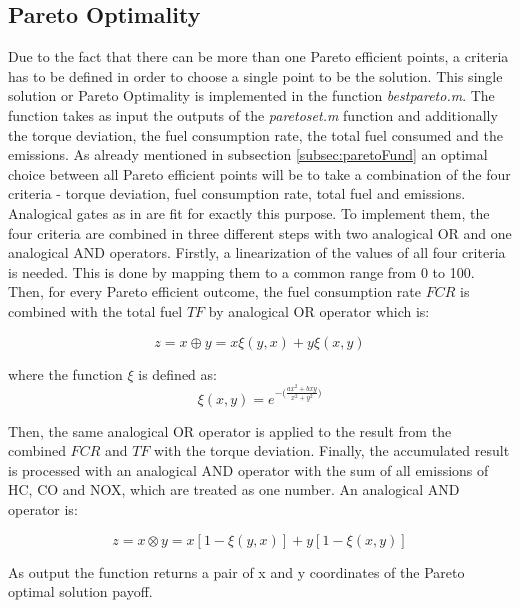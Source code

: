 \subsection{Pareto Optimality}
\label{subsec:paretoImpl}
Due to the fact that there can be more than one Pareto efficient points, a criteria has to be defined in order to choose a single point to be the solution. This single solution or Pareto Optimality is implemented in the function \textit{bestpareto.m}. The function takes as input the outputs of the \textit{paretoset.m} function and additionally the torque deviation, the fuel consumption rate, the total fuel consumed and the emissions. As already mentioned in subsection \ref{subsec:paretoFund} an optimal choice between all Pareto efficient points will be to take a combination of the four criteria - torque deviation, fuel consumption rate, total fuel and emissions. Analogical gates as in \citet{badreddin1995analogical} are fit for exactly this purpose. To implement them, the four criteria are combined in three different steps with two analogical OR and one analogical AND operators. Firstly, a linearization of the values of all four criteria is needed. This is done by mapping them to a common range from 0 to 100. Then, for every Pareto efficient outcome, the fuel consumption rate $FCR$ is combined with the total fuel $TF$ by analogical OR operator which is:

\begin{equation}
z = x \oplus y = x \xi(y,x) + y \xi(x,y)
\end{equation}

where the function $\xi$ is defined as:
\begin{equation}
\xi(x,y) =  e^{-\Big(\frac{ax^2+bxy}{x^2+y^2}\Big)}
\end{equation}

Then, the same analogical OR operator is applied to the result from the combined $FCR$ and $TF$ with the torque deviation. Finally, the accumulated result is processed with an analogical AND operator with the sum of all emissions of HC, CO and NOX, which are treated as one number. An analogical AND operator is:

\begin{equation}
z = x \otimes y = x[1 - \xi(y,x)] + y[1 - \xi(x,y)]
\end{equation}

As output the function returns a pair of x and y coordinates of the Pareto optimal solution payoff.

